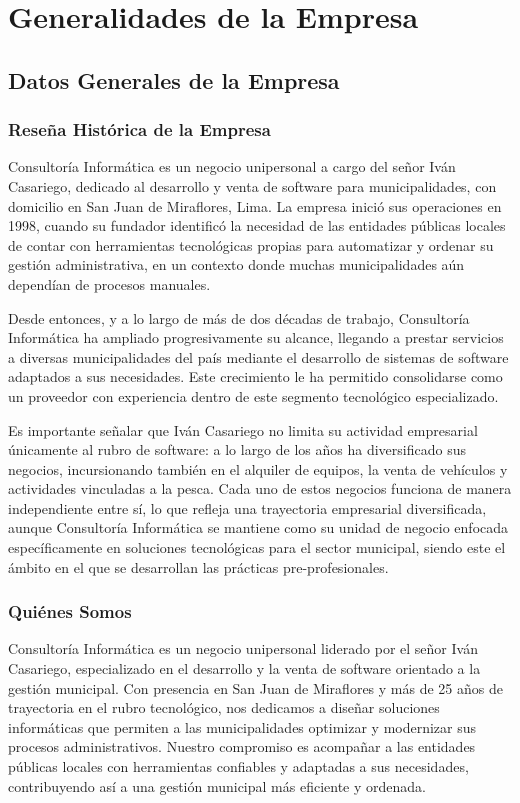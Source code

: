 \documentclass[12pt,a4paper]{report}
\begin{document}
\chapter{Generalidades de la Empresa}

\section{Datos Generales de la Empresa}

\subsection{Reseña Histórica de la Empresa}
Consultoría Informática es un negocio unipersonal a cargo del señor Iván Casariego, dedicado al desarrollo y venta de software para municipalidades, con domicilio en San Juan de Miraflores, Lima. La empresa inició sus operaciones en 1998, cuando su fundador identificó la necesidad de las entidades públicas locales de contar con herramientas tecnológicas propias para automatizar y ordenar su gestión administrativa, en un contexto donde muchas municipalidades aún dependían de procesos manuales.

Desde entonces, y a lo largo de más de dos décadas de trabajo, Consultoría Informática ha ampliado progresivamente su alcance, llegando a prestar servicios a diversas municipalidades del país mediante el desarrollo de sistemas de software adaptados a sus necesidades. Este crecimiento le ha permitido consolidarse como un proveedor con experiencia dentro de este segmento tecnológico especializado.

Es importante señalar que Iván Casariego no limita su actividad empresarial únicamente al rubro de software: a lo largo de los años ha diversificado sus negocios, incursionando también en el alquiler de equipos, la venta de vehículos y actividades vinculadas a la pesca. Cada uno de estos negocios funciona de manera independiente entre sí, lo que refleja una trayectoria empresarial diversificada, aunque Consultoría Informática se mantiene como su unidad de negocio enfocada específicamente en soluciones tecnológicas para el sector municipal, siendo este el ámbito en el que se desarrollan las prácticas pre-profesionales.
\subsection{Quiénes Somos}
Consultoría Informática es un negocio unipersonal liderado por el señor Iván Casariego, especializado en el desarrollo y la venta de software orientado a la gestión municipal. Con presencia en San Juan de Miraflores y más de 25 años de trayectoria en el rubro tecnológico, nos dedicamos a diseñar soluciones informáticas que permiten a las municipalidades optimizar y modernizar sus procesos administrativos. Nuestro compromiso es acompañar a las entidades públicas locales con herramientas confiables y adaptadas a sus necesidades, contribuyendo así a una gestión municipal más eficiente y ordenada.
\end{document}
